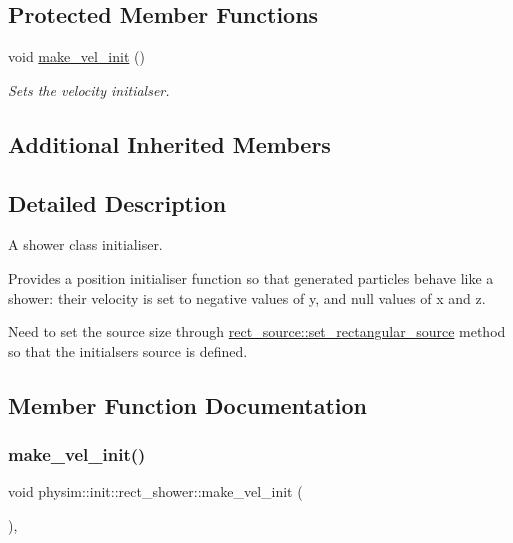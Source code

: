 \subsection*{Protected Member Functions}
\begin{DoxyCompactItemize}
\item 
void \hyperlink{classphysim_1_1init_1_1rect__shower_adb3c74e88c13b26955e4c817e7ffe343}{make\+\_\+vel\+\_\+init} ()
\begin{DoxyCompactList}\small\item\em Sets the velocity initialser. \end{DoxyCompactList}\end{DoxyCompactItemize}
\subsection*{Additional Inherited Members}


\subsection{Detailed Description}
A shower class initialiser. 

Provides a position initialiser function so that generated particles behave like a shower\+: their velocity is set to negative values of y, and null values of x and z.

Need to set the source size through \hyperlink{classphysim_1_1init_1_1rect__source_a6f398085d0f0391b2acf91cebd5b97c1}{rect\+\_\+source\+::set\+\_\+rectangular\+\_\+source} method so that the initialser\textquotesingle{}s source is defined. 

\subsection{Member Function Documentation}
\mbox{\label{classphysim_1_1init_1_1rect__shower_adb3c74e88c13b26955e4c817e7ffe343}} 
\subsubsection{\texorpdfstring{make\+\_\+vel\+\_\+init()}{make\_vel\_init()}}
{\footnotesize\ttfamily void physim\+::init\+::rect\+\_\+shower\+::make\+\_\+vel\+\_\+init (\begin{DoxyParamCaption}{ }\end{DoxyParamCaption})\hspace{0.3cm}{\ttfamily [protected]}, {\ttfamily [virtual]}}



